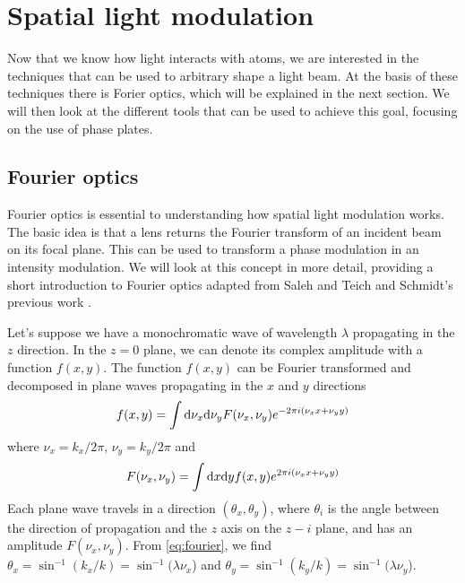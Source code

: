 \section{Spatial light modulation}
Now that we know how light interacts with atoms, we are interested in the techniques that can be used to arbitrary shape a light beam. At the basis of these techniques there is Forier optics, which will be explained in the next section. We will then look at the different tools that can be used to achieve this goal, focusing on the use of phase plates.

\subsection{Fourier optics}
Fourier optics is essential to understanding how spatial light modulation works. The basic idea  is that a lens returns the Fourier transform of an incident beam on its focal plane. This can be used to transform a phase modulation in an intensity modulation. We will look at this concept in more detail, providing a short introduction to Fourier optics adapted from Saleh and Teich \cite{saleh1991} and Schmidt's previous work \cite{schmidt2021}.

Let's suppose we have a monochromatic wave of wavelength $\lambda$ propagating in the $z$ direction. In the $z=0$ plane, we can denote its complex amplitude with a function $f(x,y)$. The function $f(x,y)$ can be Fourier transformed and decomposed in plane waves propagating in the $x$ and $y$ directions
\begin{equation}
    \label{eq:fourier}
    f(x,y) = \int \differential \nu_x \differential \nu_y F(\nu_x, \nu_y) e^{-2\pi i(\nu_xx+\nu_yy)}
\end{equation}
where $\nu_x = k_x / 2\pi$, $\nu_y = k_y / 2\pi$ and
\begin{equation}
    F(\nu_x,\nu_y) = \int \differential x \differential y f(x, y) e^{2\pi i(\nu_xx+\nu_yy)}
\end{equation}
Each plane wave travels in a direction $(\theta_x, \theta_y)$, where $\theta_i$ is the angle between the direction of propagation and the $z$ axis on the $z-i$ plane, and has an amplitude $F(\nu_x, \nu_y)$. From \cref{eq:fourier}, we find $\theta_x = \sin^{-1}(k_x / k) = \sin^{-1}(\lambda \nu_x$) and $\theta_y = \sin^{-1}(k_y / k) = \sin^{-1}(\lambda \nu_y$).

